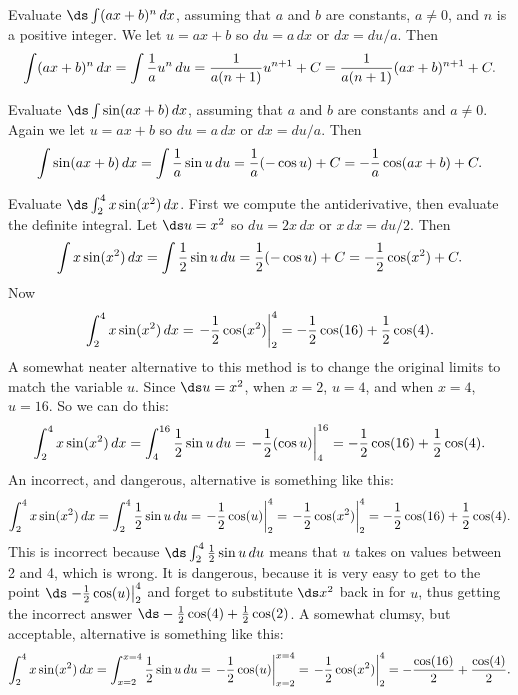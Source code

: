 \begin{example}
Evaluate $\ds\int(ax+b)^n\,dx$, assuming that $a$ and $b$ are
constants, $a\not=0$, and $n$ is a positive integer.
We let $u=ax+b$ so $du=a\,dx$ or $dx=du/a$. Then
$$
  \int(ax+b)^n\,dx=\int {1\over a} u^n\,du={1\over a(n+1)}u^{n+1}+C=
  {1\over a(n+1)}(ax+b)^{n+1}+C.
$$
\vskip-10pt\end{example}

\begin{example}
Evaluate $\ds\int \sin(ax+b)\,dx$, assuming that $a$ and $b$ are
constants and $a\not=0$.
Again we let $u=ax+b$ so $du=a\,dx$ or $dx=du/a$. Then
$$
  \int\sin(ax+b)\,dx=\int {1\over a} \sin u\,du={1\over a}(-\cos u)+C=
-{1\over a}\cos(ax+b)+C.
$$
\vskip-10pt\end{example}

\begin{example}
Evaluate $\ds\int_2^4 x\sin(x^2)\,dx$. First we compute the
antiderivative, then evaluate the definite integral.
Let $\ds u=x^2$ so $du=2x\,dx$ or $x\,dx=du/2$. Then
$$
  \int x\sin(x^2)\,dx=\int {1\over 2} \sin u\,du={1\over 2}(-\cos u)+C=
  -{1\over 2}\cos(x^2)+C.
$$
Now
$$
  \int_2^4 x\sin(x^2)\,dx=\left.-{1\over 2}\cos(x^2)\right|_2^4
  =-{1\over 2}\cos(16)+{1\over 2}\cos(4).
$$
A somewhat neater alternative to this method is to change the original
limits to match the variable $u$. Since $\ds u=x^2$, when $x=2$, $u=4$,
and when $x=4$, $u=16$. So we can do this:
$$
  \int_2^4 x\sin(x^2)\,dx=
  \int_4^{16} {1\over 2} \sin u\,du=\left.-{1\over 2}(\cos u)\right|_4^{16}
  =-{1\over 2}\cos(16)+{1\over 2}\cos(4).
$$
An incorrect, and dangerous, alternative is something like this:
$$
  \int_2^4 x\sin(x^2)\,dx=\int_2^4 {1\over 2} \sin u\,du=
  \left.-{1\over 2}\cos (u)\right|_2^4=
  \left.-{1\over 2}\cos(x^2)\right|_2^4=-{1\over 2}\cos(16)+{1\over
  2}\cos(4).
$$
This is incorrect because $\ds\int_2^4 {1\over 2} \sin u\,du$
means that $u$ takes on values between 2 and 4, which is wrong. It
is dangerous, because it is very easy to get to 
the point $\ds\left.-{1\over 2}\cos (u)\right|_2^4$ and forget to substitute
$\ds x^2$ back in for $u$, thus getting the incorrect answer
$\ds -{1\over 2}\cos(4)+{1\over 2}\cos(2)$. A somewhat clumsy, but
acceptable, alternative is something like this:
$$
  \int_2^4 x\sin(x^2)\,dx=\int_{x=2}^{x=4} {1\over 2} \sin u\,du=
  \left.-{1\over 2}\cos (u)\right|_{x=2}^{x=4}=
  \left.-{1\over 2}\cos(x^2)\right|_2^4=-{\cos(16)\over 2}+{\cos(4)\over2}.
$$
\vskip-10pt\end{example}

